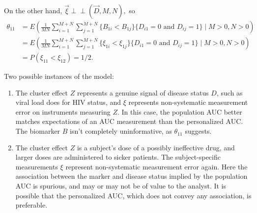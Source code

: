 \documentclass[12pt]{article}
\DeclareMathOperator{\AUC}{AUC}
\newcommand{\E}{E}
\renewcommand{\P}{P}
\newcommand{\cind}{\perp \!\!\! \perp}
\newcommand{\aucindiv}{\theta_{11}}%
\begin{document}
On the other hand, $\vec{\xi}\cind (\vec{D},M,N),$ so 
\begin{align}
  \aucindiv &= \E\left(\frac{1}{MN}\sum_{i=1}^{M+N}\sum_{j=1}^{M+N} \{B_{1i}<B_{1j}\}\{D_{i1}=0\text{ and }D_{ij}=1\}\mid M>0,N>0\right)\\
  &= \E\left(\frac{1}{MN}\sum_{i=1}^{M+N}\sum_{j=1}^{M+N} \{\xi_{1i}<\xi_{1j}\}\{D_{i1}=0\text{ and }D_{ij}=1\}\mid M>0,N>0\right)\\
  &=\P(\xi_{11}<\xi_{12})=1/2.
\end{align}

Two possible instances of the model:
\begin{enumerate}[label=(\alph*)]
\item The cluster effect $Z$ represents a genuine signal of disease
status $D$, such as viral load does for HIV status, and $\xi$ represents
non-systematic measurement error on instruments measuring $Z$. In this
case, the population AUC better matches expectations of an AUC
measurement than the personalized AUC. The biomarker $B$ isn't
completely uninformative, as $\aucindiv$ suggests.
\item \label{item:example:threshold model:spurious} The cluster effect $Z$ is a subject's dose of a possibly ineffective drug,
and larger doses are administered to sicker patients. The subject-specific
measurements $\xi$ represent non-systematic measurement error
again. Here the association between the marker and disease status
implied by the population AUC is spurious, and may or may not be of
value to the analyst. It is possible that the personalized AUC, which
does not convey any association, is preferable.
\end{enumerate}
\end{document}

